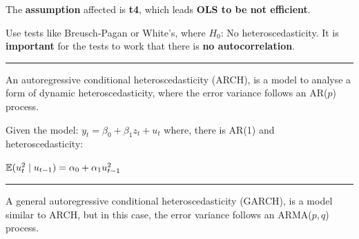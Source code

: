   \begin{f}

The \textbf{assumption} affected is \textbf{t4}, which leads \textbf{OLS to be not efficient}.

Use tests like Breusch-Pagan or White's, where \(H_{0}\): No heteroscedasticity. It is \textbf{important} for the tests to work that there is \textbf{no autocorrelation}.

\end{f}  \hrule  
\begin{f}[ARCH]

An autoregressive conditional heteroscedasticity (ARCH), is a model to analyse a form of dynamic heteroscedasticity, where the error variance follows an AR(\(p\)) process.

Given the model: \(y_{t} = \beta_{0} + \beta_{1} z_{t} + u_{t}\) where, there is AR(1) and heteroscedasticity:

\begin{center}
	\(\mathbb{E}(u^{2}_{t} \mid u_{t - 1}) = \alpha_{0} + \alpha_{1} u^{2}_{t - 1}\)
\end{center}

\end{f}  \hrule 
 \begin{f}[GARCH]

A general autoregressive conditional heteroscedasticity (GARCH), is a model similar to ARCH, but in this case, the error variance follows an ARMA(\(p, q\)) process.
\end{f}